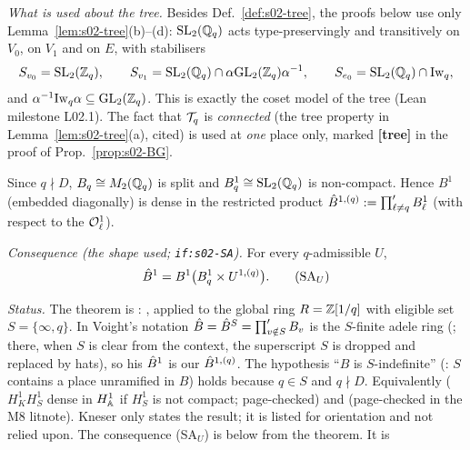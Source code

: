 \emph{What is used about the tree.} Besides Def.~\ref{def:s02-tree}, the proofs below use only Lemma~\ref{lem:s02-tree}(b)--(d):
$\mathrm{SL}_2(\mathbb{Q}_q)$ acts type-preservingly and transitively on $V_0$, on $V_1$ and on $E$, with stabilisers
\[S_{v_0}=\mathrm{SL}_2(\mathbb{Z}_q),\qquad S_{v_1}=\mathrm{SL}_2(\mathbb{Q}_q)\cap\alpha\mathrm{GL}_2(\mathbb{Z}_q)\alpha^{-1},\qquad S_{e_0}=\mathrm{SL}_2(\mathbb{Q}_q)\cap\mathrm{Iw}_q,\]
and $\alpha^{-1}\mathrm{Iw}_q\alpha\subseteq\mathrm{GL}_2(\mathbb{Z}_q)$. This is exactly the coset model of the tree (Lean milestone L02.1). The fact that
$\mathcal{T}_q$ is \emph{connected} (the tree property in Lemma~\ref{lem:s02-tree}(a), cited) is used at \emph{one} place only, marked
\textbf{[tree]} in the proof of Prop.~\ref{prop:s02-BG}.

\begin{theorem}[strong approximation for $B^1$ at $S=\{\infty,q\}$]\label{thm:s02-SA}
Since $q\nmid D$, $B_q\cong M_2(\mathbb{Q}_q)$ is split and $B^1_q\cong\mathrm{SL}_2(\mathbb{Q}_q)$ is non-compact. Hence $B^1$ (embedded diagonally) is
dense in the restricted product $\hat{B}^{1,(q)}:=\prod'_{\ell\ne q}B^1_\ell$ (with respect to the $\mathcal{O}^1_\ell$).
\smallskip

\noindent\emph{Consequence (the shape used; \texttt{if:s02-SA}).}\label{if:s02-SA} For every $q$-admissible $U$,
\[\hat{B}^1=B^1\big(B^1_q\times U^{1,(q)}\big).\tag{SA$_U$}\]
\end{theorem}
\noindent\emph{Status.} The theorem is \stcited{}:
, applied to the global ring $R=\mathbb{Z}[1/q]$ with eligible set
$S=\{\infty,q\}$. In Voight's notation $\hat{B}=\hat{B}^S=\prod'_{v\notin S}B_v$ is the $S$-finite adele ring
(; there, when $S$ is clear from the context, the superscript $S$ is dropped and replaced by hats), so his
$\hat{B}^1$ is our $\hat{B}^{1,(q)}$. The hypothesis ``$B$ is $S$-indefinite'' (: $S$ contains a place unramified in $B$) holds because $q\in S$ and $q\nmid D$.
Equivalently  ($H^1_KH^1_S$ dense in
$H^1_{\mathbb{A}}$ if $H^1_S$ is not compact; page-checked) and
 (page-checked in the M8 litnote).
Kneser  only states the result;
it is listed for orientation and not relied upon. The consequence (SA$_U$) is \stproved{} below from the theorem. It is
